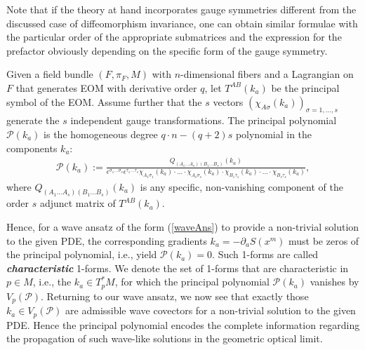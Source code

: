 Note that if the theory at hand incorporates gauge symmetries different from the discussed case of diffeomorphism invariance, one can obtain similar formulae with the particular order of the appropriate submatrices and the expression for the prefactor obviously depending on the specific form of the gauge symmetry.
\begin{definition}
Given a field bundle $(F,\pi_F,M)$ with $n$-dimensional fibers and a Lagrangian on $F$ that generates EOM with derivative order $q$, let  $T^{AB}(k_a)$ be the principal symbol of the EOM. Assume further that the $s$ vectors $(\chi_{A\sigma}(k_a))_{\sigma=1,...,s}$ generate the $s$ independent gauge transformations. The principal polynomial $\mathcal{P}(k_a)$
is the homogeneous degree $q\cdot n - (q+2)s$ polynomial in the components $k_a$:
\begin{align}
\mathcal{P}(k_a) := \frac{Q_{(A_1...A_s)(B_1...B_s)}(k_a)}{\epsilon^{\sigma_1...\sigma_s} \epsilon^{\tau_1...\tau_s} \chi_{A_1\sigma_1}(k_a)\cdot ... \cdot \chi_{A_s\sigma_s}(k_a) \cdot \chi_{B_1\tau_1}(k_a) \cdot ... \cdot \chi_{B_s\tau_s}(k_a)},
\end{align}
where $Q_{(A_1...A_s)(B_1...B_s)}(k_a)$ is any specific, non-vanishing component of the order $s$ adjunct matrix of $T^{AB}(k_a)$.
\end{definition}
Hence, for a wave ansatz of the form (\ref{waveAns}) to provide a non-trivial solution to the given PDE, the corresponding gradients $k_a = - \partial_aS(x^m)$ must be zeros of the principal polynomial, i.e., yield $\mathcal{P}(k_a) = 0$.
Such 1-forms are called \textit{\textbf{characteristic}} 1-forms. We denote the set of 1-forms that are characteristic in $p \in M$, i.e., the $k_a \in T_p^{\ast}M$, for which the principal  polynomial $\mathcal{P}(k_a)$ vanishes by $V_p(\mathcal{P})$. Returning to our wave ansatz, we now see that exactly those $k_a \in V_p(\mathcal{P})$ are admissible wave covectors for a non-trivial solution to the given PDE. Hence the principal polynomial encodes the complete information regarding the propagation of such wave-like solutions in the geometric optical limit.

